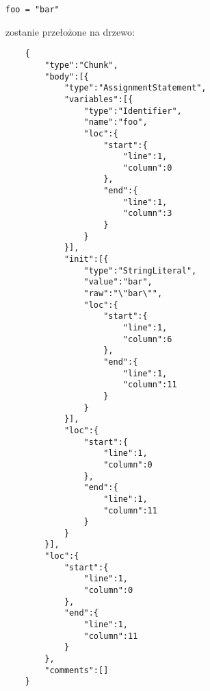 \begin{lstlisting}[language={[5.3]Lua}]
foo = "bar"
\end{lstlisting}
zostanie przełożone na drzewo:

\begin{lstlisting}
    {
        "type":"Chunk",
        "body":[{
            "type":"AssignmentStatement",
            "variables":[{
                "type":"Identifier",
                "name":"foo",
                "loc":{
                    "start":{
                        "line":1,
                        "column":0
                    },
                    "end":{
                        "line":1,
                        "column":3
                    }
                }
            }],
            "init":[{
                "type":"StringLiteral",
                "value":"bar",
                "raw":"\"bar\"",
                "loc":{
                    "start":{
                        "line":1,
                        "column":6
                    },
                    "end":{
                        "line":1,
                        "column":11
                    }
                }
            }],
            "loc":{
                "start":{
                    "line":1,
                    "column":0
                },
                "end":{
                    "line":1,
                    "column":11
                }
            }
        }],
        "loc":{
            "start":{
                "line":1,
                "column":0
            },
            "end":{
                "line":1,
                "column":11
            }
        },
        "comments":[]
    }
\end{lstlisting}
